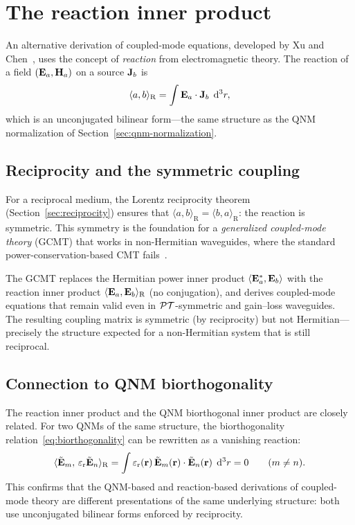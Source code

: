 \section{The reaction inner product}
\label{sec:reaction}

An alternative derivation of coupled-mode equations, developed by Xu and
Chen~\cite{xu2015general}, uses the concept of \emph{reaction} from
electromagnetic theory. The reaction of a field $(\mathbf{E}_a, \mathbf{H}_a)$ on a
source $\mathbf{J}_b$ is
\begin{equation}
 \langle a, b\rangle_{\mathrm{R}}
 = \int \mathbf{E}_a\cdot\mathbf{J}_b\;\mathop{}\!\mathrm{d}^3 r,
 \label{eq:reaction-def}
\end{equation}
which is an unconjugated bilinear form---the same structure as the QNM
normalization of Section~\ref{sec:qnm-normalization}.

\subsection{Reciprocity and the symmetric coupling}
\label{ssec:reaction-reciprocity}

For a reciprocal medium, the Lorentz reciprocity theorem
(Section~\ref{sec:reciprocity}) ensures that
$\langle a, b\rangle_{\mathrm{R}} = \langle b, a\rangle_{\mathrm{R}}$:
the reaction is symmetric. This symmetry is the foundation for a
\emph{generalized coupled-mode theory} (GCMT) that works in non-Hermitian
waveguides, where the standard power-conservation-based CMT
fails~\cite{xu2015general}.

The GCMT replaces the Hermitian power inner product
$\langle\mathbf{E}_a^*,\mathbf{E}_b\rangle$ with the reaction inner product
$\langle\mathbf{E}_a,\mathbf{E}_b\rangle_{\mathrm{R}}$ (no conjugation), and derives
coupled-mode equations that remain valid even in $\mathcal{PT}$-symmetric and
gain--loss waveguides. The resulting coupling matrix is symmetric
(by reciprocity) but not Hermitian---precisely the structure expected for
a non-Hermitian system that is still reciprocal.

\subsection{Connection to QNM biorthogonality}
\label{ssec:reaction-qnm}

The reaction inner product and the QNM biorthogonal inner product are
closely related. For two QNMs of the same structure, the biorthogonality
relation~\eqref{eq:biorthogonality} can be rewritten as a vanishing
reaction:
\begin{equation}
 \langle\tilde{\mathbf{E}}_m,\,\varepsilon_{\mathrm{r}}\tilde{\mathbf{E}}_n\rangle_{\mathrm{R}}
 = \int \varepsilon_{\mathrm{r}}(\mathbf{r})\,\tilde{\mathbf{E}}_m(\mathbf{r})\cdot\tilde{\mathbf{E}}_n(\mathbf{r})\;\mathop{}\!\mathrm{d}^3r
 = 0
 \qquad (m \neq n).
 \label{eq:reaction-biorthogonal}
\end{equation}
This confirms that the QNM-based and reaction-based derivations of
coupled-mode theory are different presentations of the same underlying
structure: both use unconjugated bilinear forms enforced by reciprocity.

